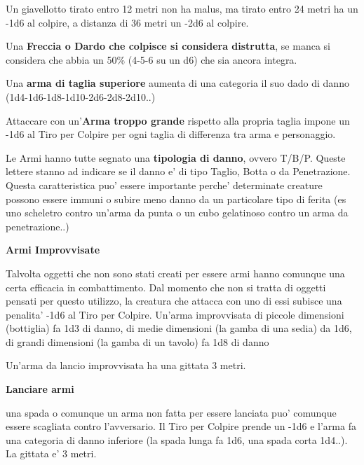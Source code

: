 \documentclass[a4paper,11pt,twoside,openany]{dndbook}
\begin{document}
{Un giavellotto tirato entro 12 metri non ha malus, ma tirato entro 24 metri ha un -1d6 al colpire, a distanza di 36 metri un -2d6 al colpire.

\medskip


Una \textbf{Freccia o Dardo che colpisce si considera distrutta}, se manca si considera che abbia un 50\% (4-5-6 su un d6) che sia ancora integra.

\medskip

Una \textbf{arma di taglia superiore} aumenta di una categoria il suo dado di danno (1d4-1d6-1d8-1d10-2d6-2d8-2d10..)

\medskip

Attaccare con un'\textbf{Arma troppo grande} rispetto alla propria taglia impone un -1d6 al Tiro per Colpire per ogni taglia di differenza tra arma e personaggio.

\medskip

Le Armi hanno tutte segnato una \textbf{tipologia di danno}, ovvero T/B/P. 	Queste lettere stanno ad indicare se il danno e' di tipo Taglio, Botta 	o da Penetrazione. Questa caratteristica puo' essere importante perche' 	determinate creature possono essere immuni o subire meno danno da 	un particolare tipo di ferita (es uno scheletro contro un'arma da 	punta o un cubo gelatinoso contro un arma da penetrazione..)

\medskip

\textbf{Armi Improvvisate}
	
Talvolta oggetti che non sono stati creati per essere armi hanno comunque una certa efficacia in combattimento. Dal momento che non si tratta di oggetti pensati per questo utilizzo, la creatura che attacca con uno di essi subisce una penalita' -1d6 al Tiro per Colpire. Un'arma improvvisata di piccole dimensioni (bottiglia) fa 1d3 di danno, di medie dimensioni (la gamba di una sedia) da 1d6, di grandi dimensioni (la gamba di un tavolo) fa 1d8 di danno
	
Un'arma da lancio improvvisata ha una gittata 3 metri.

\medskip

\textbf{Lanciare armi}
	
una spada o comunque un arma non fatta per essere lanciata puo' comunque essere scagliata contro l'avversario. Il Tiro per Colpire prende un -1d6 e l'arma fa una categoria di danno inferiore (la spada lunga fa 1d6, una spada corta 1d4..). La gittata e' 3 metri.

}
\end{document}
